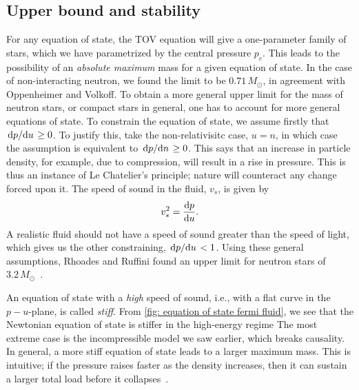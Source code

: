 
\subsection{Upper bound and stability}


For any equation of state, the TOV equation will give a one-parameter family of stars, which we have parametrized by the central pressure $p_c$.
This leads to the possibility of an \emph{absolute maximum} mass for a given equation of state.
In the case of non-interacting neutron, we found the limit to be $0.71 \, M_\odot$, in agreement with Oppenheimer and Volkoff.
To obtain a more general upper limit for the mass of neutron stars, or compact stars in general, one has to account for more general equations of state.
To constrain the equation of state, we assume firstly that $\odv{p}/{u} \geq 0$.
To justify this, take the non-relativisitc case, $u = n$, in which case the assumption is equivalent to $\odv{p}/{n} \geq 0$.
This says that an increase in particle density, for example, due to compression, will result in a rise in pressure.
This is thus an instance of Le Chatelier's principle; nature will counteract any change forced upon it.
The speed of sound in the fluid, $v_s$, is given by~\autocite{weinbergGravitationCosmologyPrinciples1972}
%
\begin{equation}
    v_s^2 = \odv{p}{u}.
\end{equation}
%
A realistic fluid should not have a speed of sound greater than the speed of light, which gives us the other constraining, $\odv{p}/{u} < 1$.
Using these general assumptions, Rhoades and Ruffini found an upper limit for neutron stars of $3.2 \, M_\odot$~\cite{rhoadesMaximumMassNeutron1974}.

An equation of state with a \emph{high} speed of sound, i.e., with a flat curve in the $p-u$-plane, is called \emph{stiff}.
From \autoref{fig: equation of state fermi fluid}, we see that the Newtonian equation of state is stiffer in the high-energy regime
The most extreme case is the incompressible model we saw earlier, which breaks causality.
In general, a more stiff equation of state leads to a larger maximum mass.
This is intuitive; if the pressure raises faster as the density increases, then it can sustain a larger total load before it collapses~\autocite{glendenningCompactStarsNuclear2012}.



